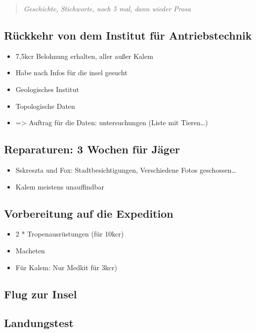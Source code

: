 \documentclass[11pt]{scrartcl}
\begin{document}
\begin{quote}
\emph{Geschichte, Stichworte, noch 5 mal, dann wieder Prosa}

\end{quote}
\subsection{Rückkehr von dem Institut für Antriebstechnik}

\begin{itemize}
\item
  7,5kcr Belohnung erhalten, aller außer Kalem
\item
  Habe nach Infos für die insel gesucht
\item
  Geologisches Institut
\item
  Topologische Daten
\item
  =\textgreater{} Auftrag für die Daten: untersuchungen (Liste mit
  Tieren\ldots{})
\end{itemize}
\subsection{Reparaturen: 3 Wochen für Jäger}

\begin{itemize}
\item
  Sskreszta und Fox: Stadtbesichtigungen, Verschiedene Fotos
  geschossen\ldots{}
\item
  Kalem meistens unauffindbar
\end{itemize}
\subsection{Vorbereitung auf die Expedition}

\begin{itemize}
\item
  2 * Tropenausrüstungen (für 10kcr)
\item
  Macheten
\item
  Für Kalem: Nur Medkit für 3kcr)
\end{itemize}
\subsection{Flug zur Insel}

\subsection{Landungstest}
\end{document}
